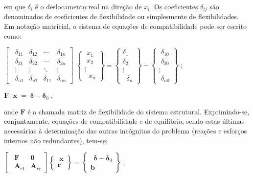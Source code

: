 \noindent em que \(\delta_{i}\) é o deslocamento real na direção de \(x_i\). Os coeficientes \(\delta_{ij}\) são denominados de coeficientes de flexibilidade ou simplesmente de flexibilidades. Em notação matricial, o sistema de equações de compatibilidade pode ser escrito como:

\par\bigskip

\begin{minipage}{0.6\textwidth}
\(
\left[ \;\;
	\begin{matrix}
		\delta_{11} & \delta_{12} & \cdots      & \delta_{1n} \\
		\delta_{21} & \delta_{22} & \cdots      & \delta_{2n} \\
		\vdots      & \vdots      & \ddots      & \vdots      \\
		\delta_{n1} & \delta_{n2} & \delta_{11} & \delta_{nn}
	\end{matrix}
	\right]
\)
\(
\begin {Bmatrix}
\; x_1 \\
\; x_2 \\
\vdots  \\
\;\;  x_n  \end{Bmatrix}=\begin{Bmatrix}
	\delta_1 \\
	\delta_2 \\
	\vdots   \\
	\;\; \delta_n\end{Bmatrix}-\begin{Bmatrix}
	\;\delta_{10} \\
	\;\delta_{20} \\
	\vdots        \\
	\;\delta_{n0}
\end{Bmatrix} \; ; \quad
\)
\end{minipage}
\begin{minipage}{0.35\textwidth}
	\(\mathbf{F} \cdot \mathbf{x} \;=\; \boldsymbol{\delta}-\boldsymbol{\delta}_0
	\; ,\)
\end{minipage}

\par\bigskip

\noindent onde \(\mathbf{F}\) é a chamada matriz de flexibilidade do sistema estrutural. Exprimindo-se, conjuntamente, equações de compatibilidade e de equilíbrio, sendo estas últimas necessárias à determinação das outras incógnitas do problema (reações e esforços internos não redundantes), tem-se:

\par\bigskip
\(
\left [\;\, \begin{matrix}
		\mathbf{F}      & \mathbf{0}      \\
		\mathbf{A}_{r1} & \mathbf{A}_{rr}
	\end{matrix}
	\right ]\begin{Bmatrix}
	\; \mathbf{x}
	\\
	\mathbf{r}
\end{Bmatrix}=\begin{Bmatrix}
	\;\, \boldsymbol{\delta}-\boldsymbol{\delta}_0
	\\
	\mathbf{b}
\end{Bmatrix}  \; ,
\)
\par\bigskip

